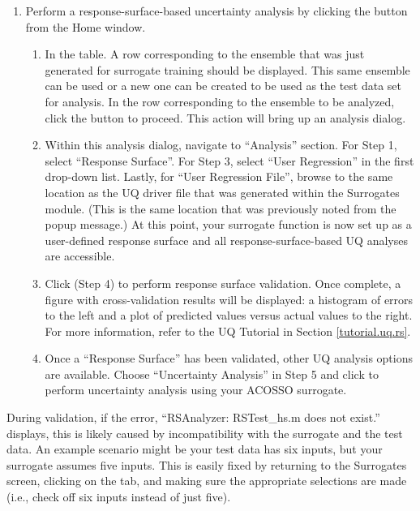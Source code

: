 \begin{enumerate}
{}
\item{Perform a response-surface-based uncertainty analysis by clicking the 
   button from the Home window.
\begin{enumerate}
\item{In the  table. A row corresponding to the ensemble that was just
  generated for surrogate training should be displayed. This same ensemble can be used or
  a new one can be created to be used as the test data set for analysis. 
  In the row corresponding to the ensemble
  to be analyzed, click the  button to proceed. This
  action will bring up an analysis dialog.} 
\item{Within this analysis dialog, navigate to ``Analysis'' section. For
  Step 1, select ``Response Surface''. For Step 3, select ``User
  Regression'' in the first drop-down list. Lastly, for ``User Regression File'',
  browse to the same location as the UQ driver file that was
  generated within the Surrogates module. (This is the same location that
  was previously noted from the popup message.) 
  At this point, your surrogate function is now set up as a user-defined
  response surface and all response-surface-based UQ analyses are accessible.}
\item{Click  (Step 4) to perform response surface validation. Once
  complete, a figure with cross-validation results will be displayed: 
  a histogram of errors to the left and a plot of predicted values versus
  actual values to the right. For more information, refer to the UQ
  Tutorial in Section \ref{tutorial.uq.rs}.}
\item{Once a ``Response Surface'' has been validated, other UQ analysis options
  are available. Choose ``Uncertainty Analysis'' in Step 5 and click
   to perform uncertainty analysis using your ACOSSO surrogate.}
\end{enumerate}
}
\end{enumerate}

During validation, if the error, ``RSAnalyzer: RSTest\_hs.m does
not exist.'' displays, this is likely caused by incompatibility with the surrogate
and the test data. An example scenario might be your test data has six
inputs, but your surrogate assumes five inputs. This is easily fixed by
returning to the Surrogates screen, clicking on the 
tab, and making sure the appropriate selections are made (i.e., check off six
inputs instead of just five).
